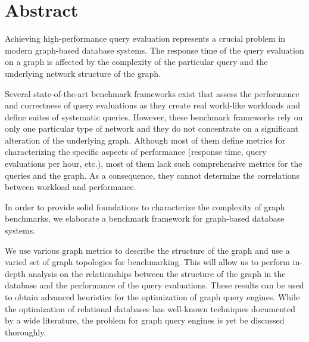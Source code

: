 


\vfill
{}
\englishParagraph


\chapter*{Abstract}
Achieving high-performance query evaluation represents a crucial problem in modern graph-based database systems. The response time of the query evaluation on a graph is affected by the complexity of the particular query and the underlying network structure of the graph. 

Several state-of-the-art benchmark frameworks exist that assess the performance and correctness of query evaluations as they create real world-like workloads and define suites of systematic queries. However, these benchmark frameworks rely on only one particular type of network and they do not concentrate on a significant alteration of the underlying graph. Although most of them define metrics for characterizing the specific aspects of performance (response time, query evaluations per hour, etc.), most of them lack such comprehensive metrics for the queries and the graph.
As a consequence, they cannot determine the correlations between workload and performance.


In order to provide solid foundations to characterize the complexity of graph benchmarks, we elaborate a benchmark framework for graph-based database systems.

We use various graph metrics to describe the structure of the graph %
and use a varied set of graph topologies for benchmarking. This will allow us to perform in-depth analysis on the relationships between the structure of the graph in the database and the performance of the query evaluations. These results can be used to obtain advanced heuristics for the optimization of graph query engines. While the optimization of relational databases has well-known techniques documented by a wide literature, the problem for graph query engines is yet be discussed thoroughly.




